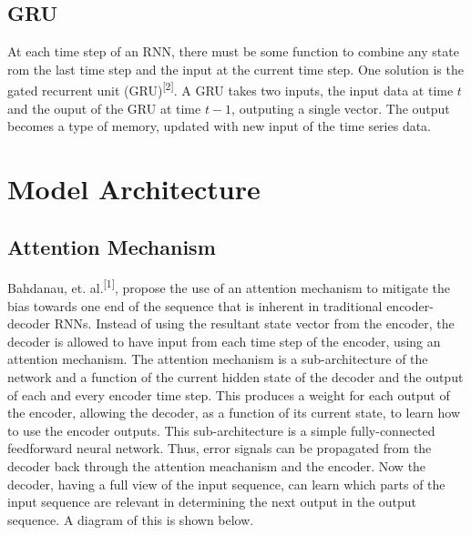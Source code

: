 \documentclass[letterpaper, 10pt]{article}
\begin{document}
\begin{multicols}{2}
\subsection{GRU}

At each time step of an RNN, there must be some function to combine any state rom the last time
step and the input at the current time step.
One solution is the gated recurrent unit (GRU)\textsuperscript{[2]}.
A GRU takes two inputs, the input data at time $t$ and the ouput of the GRU at time $t-1$, outputing
a single vector.
The output becomes a type of memory, updated with new input of the time series data.

\section{Model Architecture}

\subsection{Attention Mechanism}
Bahdanau, et. al.\textsuperscript{[1]}, propose the use of an attention mechanism to mitigate the bias
towards one end of the sequence that is inherent in traditional encoder-decoder RNNs.
Instead of using the resultant state vector from the encoder, the decoder is allowed to have input
from each time step of the encoder, using an attention mechanism.
The attention mechanism is a sub-architecture of the network and a function of the current hidden
state of the decoder and the output of each and every encoder time step.
This produces a weight for each output of the encoder, allowing the decoder, as a function of its
current state, to learn how to use the encoder outputs.
This sub-architecture is a simple fully-connected feedforward neural network.
Thus, error signals can be propagated from the decoder back through the attention meachanism and
the encoder.
Now the decoder, having a full view of the input sequence, can learn which parts of the input
sequence are relevant in determining the next output in the output sequence.
A diagram of this is shown below.


\end{multicols}
\end{document}
